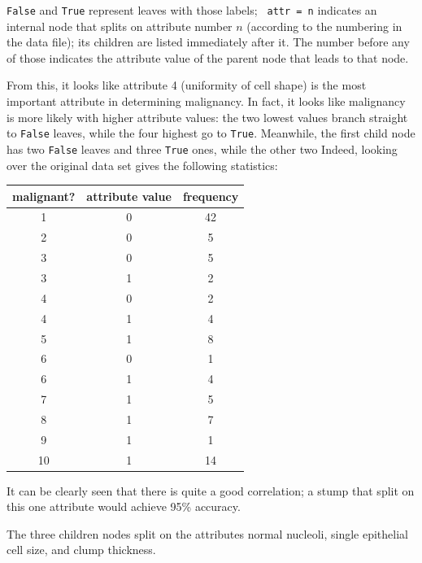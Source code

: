 \documentclass{article}
\begin{document}
\begin{enumerate}
  {\tt False} and {\tt True} represent leaves with those labels; {\tt
    attr = n} indicates an internal node that splits on attribute
  number $n$ (according to the numbering in the data file); its
  children are listed immediately after it. The number before any of
  those indicates the attribute value of the parent node that leads to
  that node.

  From this, it looks like attribute 4 (uniformity of cell shape) is
  the most important attribute in determining malignancy. In fact, it
  looks like malignancy is more likely with higher attribute values:
  the two lowest values branch straight to {\tt False} leaves, while
  the four highest go to {\tt True}. Meanwhile, the first child node
  has two {\tt False} leaves and three {\tt True} ones, while the
  other two  Indeed, looking over the original
  data set gives the following statistics:

  \begin{center}
    \begin{tabular}{|c|c|c|}\hline
      malignant? & attribute value & frequency \\\hline
      1 & 0 & 42 \\\hline
      2 & 0 & 5 \\\hline
      3 & 0 & 5 \\
      3 & 1 & 2 \\\hline
      4 & 0 & 2 \\
      4 & 1 & 4 \\\hline
      5 & 1 & 8 \\\hline
      6 & 0 & 1 \\
      6 & 1 & 4 \\\hline
      7 & 1 & 5 \\\hline
      8 & 1 & 7 \\\hline
      9 & 1 & 1 \\\hline
      10 & 1 & 14 \\\hline
    \end{tabular}
  \end{center}

  It can be clearly seen that there is quite a good correlation; a
  stump that split on this one attribute would achieve 95\% accuracy.

  The three children nodes split on the attributes normal nucleoli,
  single epithelial cell size, and clump thickness.
\end{enumerate}
\end{document}
